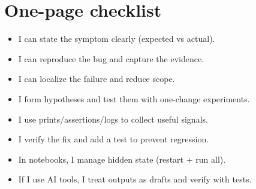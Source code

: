 \section{One-page checklist}
\begin{itemize}[noitemsep]
  \item I can state the symptom clearly (expected vs actual).
  \item I can reproduce the bug and capture the evidence.
  \item I can localize the failure and reduce scope.
  \item I form hypotheses and test them with one-change experiments.
  \item I use prints/assertions/logs to collect useful signals.
  \item I verify the fix and add a test to prevent regression.
  \item In notebooks, I manage hidden state (restart + run all).
  \item If I use AI tools, I treat outputs as drafts and verify with tests.
\end{itemize}
